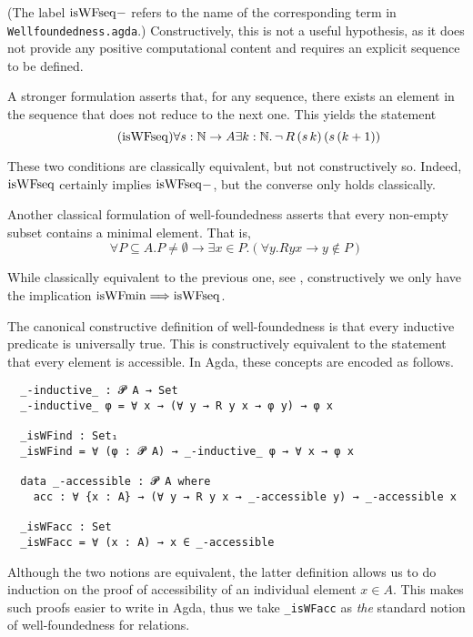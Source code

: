 (The label $\mathrm{isWFseq}{-}$ refers to the name of the corresponding term in \texttt{Wellfoundedness.agda}.)
Constructively, this is not a useful hypothesis, as it does not provide any positive computational content and requires an explicit sequence to be defined. 
 
A stronger formulation asserts that, for any sequence, there exists an element
in the sequence that does not reduce to the next one.  This yields the statement
\[\tag{$\isWFseq$} \forall s : \nat \to A \exists k : \nat.\, \lnot \, R \,(s\,k)\,(s\,(k+1)) \]

These two conditions are classically equivalent, but not constructively so.
Indeed, $\mathrm{isWFseq}$ certainly implies $\mathrm{isWFseq}{-}$, but the converse only holds classically. 

Another classical formulation of well-foundedness
asserts that every non-empty subset
contains a minimal element.  That is,
\[ \tag{$\isWFmin$} \forall P \subseteq A. P \neq \emptyset \to \exists x \in P. (\forall y. Ryx \to y\notin P) \]

While classically equivalent to the previous one, see \cite[Exercise A.1.8]{Terese},
constructively we only have the implication $\mathrm{isWFmin} \Longrightarrow \mathrm{isWFseq}$. 

The canonical constructive definition of well-foundedness is that
every inductive predicate is universally true.
This is constructively equivalent to the statement that every element
is accessible.  In Agda, these concepts are encoded as follows.
{\small
\begin{verbatim}
  _-inductive_ : 𝓟 A → Set
  _-inductive_ φ = ∀ x → (∀ y → R y x → φ y) → φ x

  _isWFind : Set₁
  _isWFind = ∀ (φ : 𝓟 A) → _-inductive_ φ → ∀ x → φ x

  data _-accessible : 𝓟 A where
    acc : ∀ {x : A} → (∀ y → R y x → _-accessible y) → _-accessible x

  _isWFacc : Set
  _isWFacc = ∀ (x : A) → x ∈ _-accessible
\end{verbatim}
}
Although the two notions are equivalent, the latter definition allows us to do induction on the proof of accessibility of an individual element $x \in A$.  This makes such proofs easier to write in Agda, thus we take
\verb|_isWFacc| as \emph{the} standard notion of well-foundedness for relations.  

